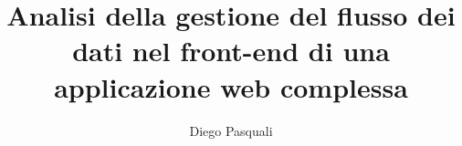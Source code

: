 \documentclass{report}
\author{Diego Pasquali}
\title{Analisi della gestione del flusso dei dati nel front-end di una applicazione web complessa}
\begin{document}
    \maketitle
    \pagebreak

    \tableofcontents
    \pagebreak

    
    

     
    
\end{document}
